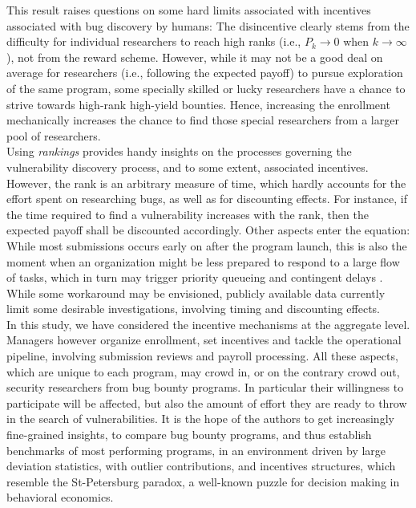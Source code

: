 This result raises questions on some hard limits associated with incentives associated with bug discovery by humans: The disincentive clearly stems from the difficulty for individual researchers to reach high ranks (i.e., $P_{k} \rightarrow 0$ when $k \rightarrow \infty$), not from the reward scheme. However, while it may not be a good deal on average for researchers (i.e., following the expected payoff) to pursue exploration of the same program, some specially skilled or lucky researchers have a chance to strive towards high-rank high-yield bounties. Hence, increasing the enrollment mechanically increases the chance to find those special researchers from a larger pool of researchers.\\

Using {\it rankings} provides handy insights on the processes governing the vulnerability discovery process, and to some extent, associated incentives. However, the rank is an arbitrary measure of time, which hardly accounts for the effort spent on researching bugs, as well as for discounting effects. For instance, if the time required to find a vulnerability increases with the rank, then the expected payoff shall be discounted accordingly. Other aspects enter the equation: While most submissions occurs early on after the program launch, this is also the moment when an organization might be less prepared to respond to a large flow of tasks, which in turn may trigger priority queueing and contingent delays \cite{maillart2011quantification}. While some workaround may be envisioned, publicly available data currently limit some desirable investigations, involving timing and discounting effects.\\

In this study, we have considered the incentive mechanisms at the aggregate level. Managers however organize enrollment, set incentives and tackle the operational pipeline, involving submission reviews and payroll processing. All these aspects, which are unique to each program, may crowd in, or on the contrary crowd out, security researchers from bug bounty programs. In particular their willingness to participate will be affected, but also the amount of effort they are ready to throw in the search of vulnerabilities. It is the hope of the authors to get increasingly fine-grained insights, to compare bug bounty programs, and thus establish benchmarks of most performing programs, in an environment driven by large deviation statistics, with outlier contributions, and incentives structures, which resemble the St-Petersburg paradox, a well-known puzzle for decision making in behavioral economics.
